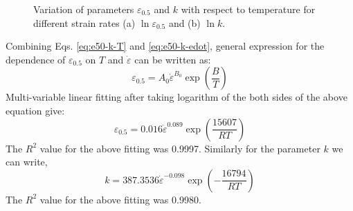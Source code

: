 \documentclass[a4paper, 11pt, dvipsnames]{article}
\begin{document}
\begin{figure*}[!ht]
{\label{figb:JAlloyCompd-k}
}
\caption{Variation of parameters $\varepsilon_{0.5}$ and $k$ with respect to temperature for different strain rates (a) $\ln \varepsilon_{0.5}$ and (b) $\ln k$.}\label{fig:xc-k-JAlloyCompd}
\end{figure*}

Combining Eqs. \eqref{eq:e50-k-T} and \eqref{eq:e50-k-edot}, general expression for the dependence of $\varepsilon_{0.5}$ on $T$ and $\dot{\varepsilon}$ can be written as:
\begin{equation*}
\varepsilon_{0.5} = A_0\dot{\varepsilon}^{B_0} \exp\left(\frac{B}{T}\right)
\end{equation*}
Multi-variable linear fitting after taking logarithm of the both sides of the above equation give:
\begin{equation}\label{e50-gen}
\varepsilon_{0.5} = 0.016\dot{\varepsilon}^{0.089}\exp\left(\frac{15607}{RT}\right)
\end{equation}
The $R^2$ value for the above fitting was 0.9997. Similarly for the parameter $k$ we can write,
\begin{equation}\label{k-gen}
k = 387.3536\dot{\varepsilon}^{-0.098}\exp\left(-\frac{16794}{RT}\right)
\end{equation}
The $R^2$ value for the above fitting was 0.9980.
\end{document}
